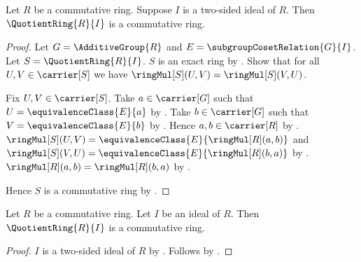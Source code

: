 \begin{theorem}\label{quotient_ring_is_commutative}
    Let $R$ be a commutative ring.
    Suppose $I$ is a two-sided ideal of $R$.
    Then $\QuotientRing{R}{I}$ is a commutative ring.
\end{theorem}
\begin{proof}
    Let $G=\AdditiveGroup{R}$ and $E=\subgroupCosetRelation{G}{I}$.
    Let $S=\QuotientRing{R}{I}$.
    $S$ is an exact ring by .
    Show that for all $U,V\in\carrier[S]$ we have
        $\ringMul[S](U,V)=\ringMul[S](V,U)$.
    \begin{subproof}
        Fix $U,V\in\carrier[S]$.
        Take $a\in\carrier[G]$ such that
            $U=\equivalenceClass{E}{a}$ by
            .
        Take $b\in\carrier[G]$ such that
            $V=\equivalenceClass{E}{b}$ by
            .
        Hence $a,b\in\carrier[R]$ by .
        $\ringMul[S](U,V)=
            \equivalenceClass{E}{\ringMul[R](a,b)}$ and
            $\ringMul[S](V,U)=
            \equivalenceClass{E}{\ringMul[R](b,a)}$ by
            .
        $\ringMul[R](a,b)=\ringMul[R](b,a)$ by
            .
    \end{subproof}
    Hence $S$ is a commutative ring by .
\end{proof}

\begin{corollary}\label{commutative_quotient_ring_is_commutative}
    Let $R$ be a commutative ring.
    Let $I$ be an ideal of $R$.
    Then $\QuotientRing{R}{I}$ is a commutative ring.
\end{corollary}
\begin{proof}
    $I$ is a two-sided ideal of $R$ by
        .
    Follows by .
\end{proof}

